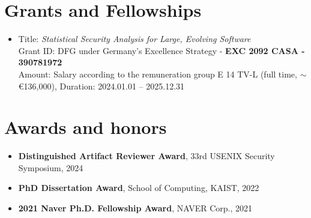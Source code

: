 \documentclass[letterpaper,11pt]{article}
\begin{document}
\section{Grants and Fellowships}
\begin{itemize}
  \item Title: \emph{Statistical Security Analysis for Large, Evolving Software} \\
        Grant ID: DFG under Germany's Excellence Strategy - \textbf{EXC 2092 CASA - 390781972} \\
        Amount: Salary according to the remuneration group E 14 TV-L (full time, $\sim$ \euro{136,000}), Duration: 2024.01.01 -- 2025.12.31
\end{itemize}


\section{Awards and honors}
\begin{itemize}[itemsep=-2pt]
  \item \textbf{Distinguished Artifact Reviewer Award}, 33rd USENIX Security Symposium, 2024
  \item \textbf{PhD Dissertation Award}, School of Computing, KAIST, 2022
  \item \textbf{2021 Naver Ph.D. Fellowship Award}, NAVER Corp., 2021
\end{itemize}
\end{document}
